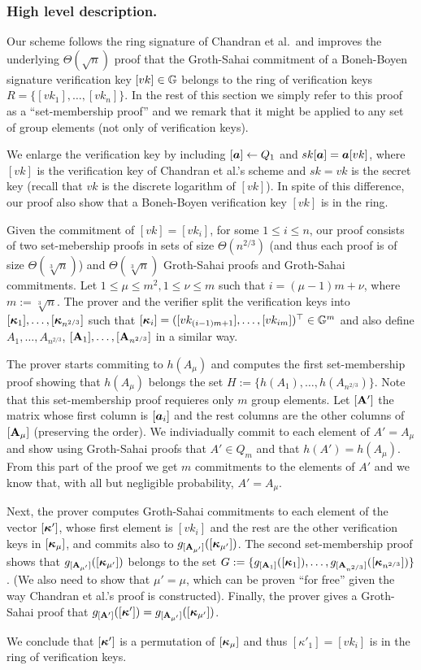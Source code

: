 \subsubsection{High level description.}
Our scheme follows the ring signature of Chandran et al.~and improves the underlying $\Theta(\sqrt{n})$ proof that the Groth-Sahai commitment of a Boneh-Boyen signature verification key $[vk]\in\mathbb{G}$ belongs to the ring of verification keys $R=\{[vk_1],\ldots,[vk_n]\}$. In the rest of this section we simply refer to this proof as a ``set-membership proof'' and we remark that it might be applied to any set of group elements (not only of verification keys).

We enlarge the verification key by including $[{\boldsymbol{a}}]\gets Q_1$ and $sk[{\boldsymbol{a}}]={\boldsymbol{a}}[vk]$, where $[vk]$ is the verification key of Chandran et al.'s scheme and $sk=vk$ is the secret key (recall that $vk$ is the discrete logarithm of $[vk]$). In spite of this difference, our proof also show that a Boneh-Boyen verification key $[vk]$ is in the ring. 

Given the commitment of $[vk]=[vk_i]$, for some $1\leq i\leq n$, our proof consists of two set-mebership proofs in sets of size $\Theta(n^{2/3})$ (and thus each proof is of size $\Theta(\sqrt[3]{n})$) and $\Theta(\sqrt[3]{n})$ Groth-Sahai proofs and Groth-Sahai commitments. Let $1\leq \mu\leq m^2, 1\leq \nu \leq m$  such that $i=(\mu-1)m + \nu$, where $m:=\sqrt[3]{n}$. The prover and the verifier split the verification keys into $[{\boldsymbol{\kappa}}_1],\ldots, [{\boldsymbol{\kappa}}_{n^{2/3}}]$ such that $[{\boldsymbol{\kappa}}_i] = ([vk_{(i-1)m+1}],\ldots,[vk_{im}])^\top\in\mathbb{G}^m$ and also define $A_1,\ldots, A_{n^{2/3}}$, $[\mathbf{{A}}_1],\ldots, [\mathbf{{A}}_{n^{2/3}}]$ in a similar way.

The prover starts commiting to $h(A_\mu)$ and computes the first set-membership proof showing that $h(A_\mu)$ belongs the set $H:=\{h(A_1),\ldots,\allowbreak h(A_{n^{2/3}})\}$. Note that this set-membership proof requieres only $m$ group elements.
Let $[\mathbf{{A}}']$ the matrix whose first column is $[{\boldsymbol{a}}_i]$ and the rest columns are the other columns of $[\mathbf{{A}}_\mu]$ (preserving the order). We indiviadually commit to each element of $A'=A_\mu$ and show using Groth-Sahai proofs that $A'\in Q_m$ and that $h(A')=h(A_\mu)$. From this part of the proof we get $m$ commitments to the elements of $A'$ and we know that, with all but negligible probability, $A'=A_\mu$.

Next, the prover computes Groth-Sahai commitments to each element of the vector $[{\boldsymbol{\kappa}}']$, whose first element is $[vk_i]$ and the rest are the other verification keys in $[{\boldsymbol{\kappa}}_\mu]$, and commits also to $g_{[\mathbf{{A_{\mu'}}}]}([{\boldsymbol{\kappa}}_{\mu'}])$. The second set-membership proof shows that $g_{[\mathbf{{A_{\mu'}}}]}([{\boldsymbol{\kappa}}_{\mu'}])$ belongs to the set $G:=\{g_{[\mathbf{{A}}_1]}([{\boldsymbol{\kappa}}_1]),\allowbreak\ldots,g_{[\mathbf{{A}}_{n^{2/3}}]}([{\boldsymbol{\kappa}}_{n^{2/3}}])\}$. (We also need to show that $\mu'=\mu$, which can be proven ``for free'' given the way Chandran et al.'s proof is constructed). Finally, the prover gives a Groth-Sahai proof that $g_{[\mathbf{{A}}']}([{\boldsymbol{\kappa}}'])=g_{[\mathbf{{A_{\mu'}}}]}([{\boldsymbol{\kappa}}_{\mu'}])$.

We conclude that $[{\boldsymbol{\kappa}}']$ is a permutation of $[{\boldsymbol{\kappa}}_\mu]$ and thus $[\kappa'_1]=[vk_i]$ is in the ring of verification keys.



